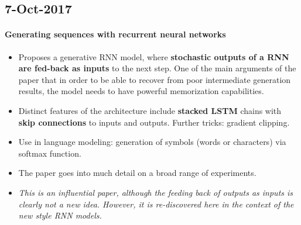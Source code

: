 \documentclass[a4paper,10pt]{article}
\begin{document}
\subsection*{7-Oct-2017}

\paragraph*{Generating sequences with recurrent neural networks \cite{graves2013generating}}
\begin{itemize}
\setlength{\itemsep}{0.5mm}
\item Proposes a generative RNN model, where \textbf{stochastic outputs of a RNN are fed-back as inputs} to the next step. One of the main arguments of the paper that in order to be able to recover from poor intermediate generation results, the model needs to have powerful memorization capabilities. 
\item Distinct features of the architecture include \textbf{stacked LSTM} chains with \textbf{skip connections} to inputs and outputs. Further tricks: gradient clipping.
\item Use in language modeling: generation of symbols (words or characters) via softmax function.  
\item The paper goes into much detail on a broad range of experiments.
\item \textit{This is an influential paper, although the feeding back of outputs as inputs is clearly not a new idea. However, it is re-discovered here in the context of the new style RNN models.} 
\end{itemize}



\end{document}
